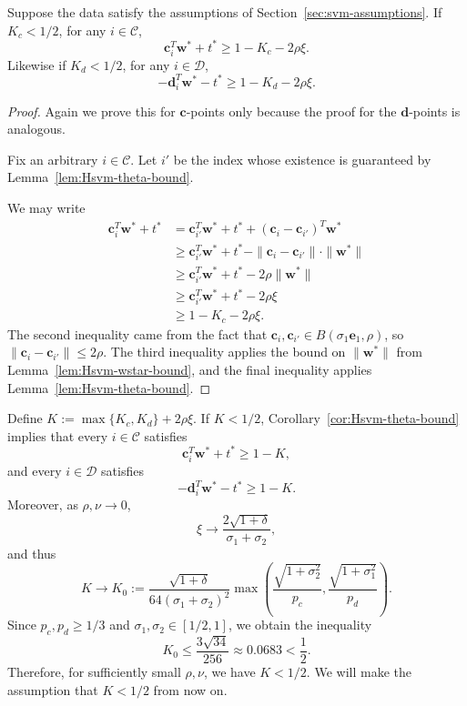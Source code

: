 \documentclass[twoside,11pt]{article}
\renewcommand{\c}{\bm{c}}
\renewcommand{\d}{\bm{d}}
\newcommand\w{\bm{w}}
\newcommand\e{\bm{e}}
\newcommand\CC{\mathcal{C}}
\newcommand\DD{\mathcal{D}}
\begin{document}
    \begin{corollary} \label{cor:Hsvm-theta-bound}
      Suppose the data satisfy the assumptions of Section~\ref{sec:svm-assumptions}. If $K_c < 1/2$, for any $i \in \CC$,
      \[
        \c_i^T\w^* + t^* \geq 1 - K_c - 2\rho\xi.
      \]
      Likewise if $K_d < 1/2$, for any $i \in \DD$,
      \[
        -\d_i^T\w^* - t^* \geq 1 - K_d - 2\rho\xi.
      \]
    \end{corollary}
    \begin{proof}
      Again we prove this for $\c$-points only because the proof for the $\d$-points is analogous.

      Fix an arbitrary $i \in \CC$. Let $i'$ be the index whose existence is guaranteed by Lemma~\ref{lem:Hsvm-theta-bound}.
      
      We may write
      \begin{align*}
          \c_i^T\w^* + t^* &= \c_{i'}^T\w^* + t^* + (\c_i - \c_{i'})^T\w^*\\
                               &\geq \c_{i'}^T\w^* + t^* - \|\c_{i}-\c_{i'}\|\cdot \|\w^*\|\\
                               &\geq \c_{i'}^T\w^* + t^* - 2\rho\|\w^*\|\\
                               &\geq \c_{i'}^T\w^* + t^* - 2\rho\xi\\
                               &\geq 1 - K_c - 2\rho\xi.
      \end{align*}
      The second inequality came from the fact that $\c_i,\c_{i'} \in B(\sigma_1\e_1,\rho)$, so $\|\c_i - \c_{i'}\| \leq 2\rho$. The third inequality applies the bound on $\|\w^*\|$ from Lemma~\ref{lem:Hsvm-wstar-bound}, and the final inequality applies Lemma~\ref{lem:Hsvm-theta-bound}.
    \end{proof}
    Define $K:=\max\{K_c,K_d\}+2\rho\xi$. If $K < 1/2$, Corollary~\ref{cor:Hsvm-theta-bound} implies that every $i\in \CC$ satisfies
    \[
        \c_i^T\w^* + t^* \geq 1-K,
    \]
    and every $i\in \DD$ satisfies
    \[
    -\d_i^T\w^* - t^* \geq 1-K.
    \]
    Moreover, as $\rho,\nu\to0$, 
    \[
    \xi\to \frac{2\sqrt{1+\delta}}{\sigma_1+\sigma_2},
    \]
    and thus
    \[
    K \to K_0:= \frac{\sqrt{1+\delta}}{64(\sigma_1+\sigma_2)^2}\max\left(\frac{\sqrt{1+\sigma_2^2}}{p_c},\frac{\sqrt{1+\sigma_1^2}}{p_d}\right).
    \]
    Since $p_c,p_d\geq1/3$ and $\sigma_1,\sigma_2\in[1/2,1]$, we obtain the inequality
    \[
        K_0 \leq \frac{3\sqrt{34}}{256} \approx 0.0683 < \frac{1}{2}.
    \]
    Therefore, for sufficiently small $\rho,\nu$, we have $K < 1/2$. We will make the assumption that $K < 1/2$ from now on.
\end{document}

